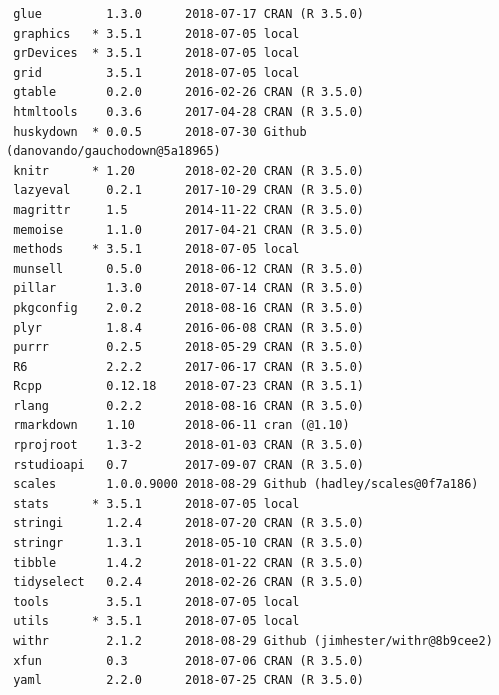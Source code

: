 \documentclass[twoside,12pt,final]{ucthesis-CA2012}
\begin{document}
\begin{ucmainmatter}
\begin{verbatim}
 glue         1.3.0      2018-07-17 CRAN (R 3.5.0)                       
 graphics   * 3.5.1      2018-07-05 local                                
 grDevices  * 3.5.1      2018-07-05 local                                
 grid         3.5.1      2018-07-05 local                                
 gtable       0.2.0      2016-02-26 CRAN (R 3.5.0)                       
 htmltools    0.3.6      2017-04-28 CRAN (R 3.5.0)                       
 huskydown  * 0.0.5      2018-07-30 Github (danovando/gauchodown@5a18965)
 knitr      * 1.20       2018-02-20 CRAN (R 3.5.0)                       
 lazyeval     0.2.1      2017-10-29 CRAN (R 3.5.0)                       
 magrittr     1.5        2014-11-22 CRAN (R 3.5.0)                       
 memoise      1.1.0      2017-04-21 CRAN (R 3.5.0)                       
 methods    * 3.5.1      2018-07-05 local                                
 munsell      0.5.0      2018-06-12 CRAN (R 3.5.0)                       
 pillar       1.3.0      2018-07-14 CRAN (R 3.5.0)                       
 pkgconfig    2.0.2      2018-08-16 CRAN (R 3.5.0)                       
 plyr         1.8.4      2016-06-08 CRAN (R 3.5.0)                       
 purrr        0.2.5      2018-05-29 CRAN (R 3.5.0)                       
 R6           2.2.2      2017-06-17 CRAN (R 3.5.0)                       
 Rcpp         0.12.18    2018-07-23 CRAN (R 3.5.1)                       
 rlang        0.2.2      2018-08-16 CRAN (R 3.5.0)                       
 rmarkdown    1.10       2018-06-11 cran (@1.10)                         
 rprojroot    1.3-2      2018-01-03 CRAN (R 3.5.0)                       
 rstudioapi   0.7        2017-09-07 CRAN (R 3.5.0)                       
 scales       1.0.0.9000 2018-08-29 Github (hadley/scales@0f7a186)       
 stats      * 3.5.1      2018-07-05 local                                
 stringi      1.2.4      2018-07-20 CRAN (R 3.5.0)                       
 stringr      1.3.1      2018-05-10 CRAN (R 3.5.0)                       
 tibble       1.4.2      2018-01-22 CRAN (R 3.5.0)                       
 tidyselect   0.2.4      2018-02-26 CRAN (R 3.5.0)                       
 tools        3.5.1      2018-07-05 local                                
 utils      * 3.5.1      2018-07-05 local                                
 withr        2.1.2      2018-08-29 Github (jimhester/withr@8b9cee2)     
 xfun         0.3        2018-07-06 CRAN (R 3.5.0)                       
 yaml         2.2.0      2018-07-25 CRAN (R 3.5.0)                       
\end{verbatim}
\backmatter


\end{ucmainmatter}
\end{document}
